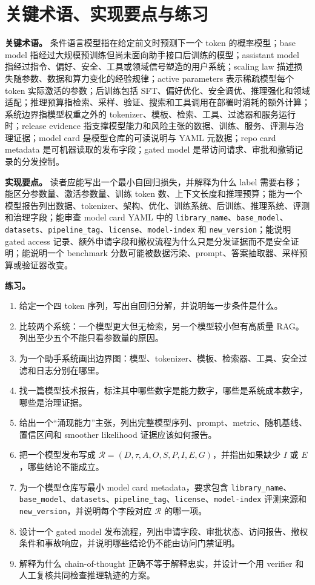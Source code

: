 \documentclass[UTF8,zihao=-4,openany]{ctexbook}
\begin{document}
\section{关键术语、实现要点与练习}
\textbf{关键术语。} 条件语言模型指在给定前文时预测下一个 token 的概率模型；base model 指经过大规模预训练但尚未面向助手接口后训练的模型；assistant model 指经过指令、偏好、安全、工具或领域信号塑造的用户系统；scaling law 描述损失随参数、数据和算力变化的经验规律；active parameters 表示稀疏模型每个 token 实际激活的参数；后训练包括 SFT、偏好优化、安全调优、推理强化和领域适配；推理预算指检索、采样、验证、搜索和工具调用在部署时消耗的额外计算；系统边界指模型权重之外的 tokenizer、模板、检索、工具、过滤器和服务运行时；release evidence 指支撑模型能力和风险主张的数据、训练、服务、评测与治理证据；model card 是模型仓库的可读说明与 YAML 元数据；repo card metadata 是可机器读取的发布字段；gated model 是带访问请求、审批和撤销记录的分发控制。

\textbf{实现要点。} 读者应能写出一个最小自回归损失，并解释为什么 label 需要右移；能区分参数量、激活参数量、训练 token 数、上下文长度和推理预算；能为一个模型报告列出数据、tokenizer、架构、优化、训练系统、后训练、推理系统、评测和治理字段；能审查 model card YAML 中的 \texttt{library\_name}、\texttt{base\_model}、\texttt{datasets}、\texttt{pipeline\_tag}、\texttt{license}、\texttt{model-index} 和 \texttt{new\_version}；能说明 gated access 记录、额外申请字段和撤权流程为什么只是分发证据而不是安全证明；能说明一个 benchmark 分数可能被数据污染、prompt、答案抽取器、采样预算或验证器改变。

\textbf{练习。}
\begin{enumerate}
\item 给定一个四 token 序列，写出自回归分解，并说明每一步条件是什么。
\item 比较两个系统：一个模型更大但无检索，另一个模型较小但有高质量 RAG。列出至少五个不能只看参数量的原因。
\item 为一个助手系统画出边界图：模型、tokenizer、模板、检索器、工具、安全过滤和日志分别在哪里。
\item 找一篇模型技术报告，标注其中哪些数字是能力数字，哪些是系统成本数字，哪些是治理证据。
\item 给出一个“涌现能力”主张，列出完整模型序列、prompt、metric、随机基线、置信区间和 smoother likelihood 证据应该如何报告。
\item 把一个模型发布写成 $\mathcal{R}=(D,\tau,A,O,S,P,I,E,G)$，并指出如果缺少 $I$ 或 $E$，哪些结论不能成立。
\item 为一个模型仓库写最小 model card metadata，要求包含 \texttt{library\_name}、\texttt{base\_model}、\texttt{datasets}、\texttt{pipeline\_tag}、\texttt{license}、\texttt{model-index} 评测来源和 \texttt{new\_version}，并说明每个字段对应 $\mathcal{R}$ 的哪一项。
\item 设计一个 gated model 发布流程，列出申请字段、审批状态、访问报告、撤权条件和事故响应，并说明哪些结论仍不能由访问门禁证明。
\item 解释为什么 chain-of-thought 正确不等于解释忠实，并设计一个用 verifier 和人工复核共同检查推理轨迹的方案。
\end{enumerate}
\end{document}
